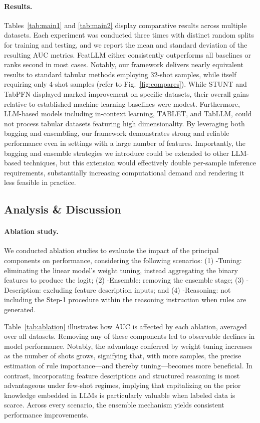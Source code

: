 \vspace*{-0.12in}
\paragraph{Results.}
Tables~\ref{tab:main1} and \ref{tab:main2} display comparative results across multiple datasets. Each experiment was conducted three times with distinct random splits for training and testing, and we report the mean and standard deviation of the resulting AUC metrics. \textsf{FeatLLM} either consistently outperforms all baselines or ranks second in most cases. Notably, our framework delivers nearly equivalent results to standard tabular methods employing 32-shot samples, while itself requiring only 4-shot samples (refer to Fig.~\ref{fig:compares}). While STUNT and TabPFN displayed marked improvement on specific datasets, their overall gains relative to established machine learning baselines were modest. Furthermore, LLM-based models including in-context learning, TABLET, and TabLLM, could not process tabular datasets featuring high dimensionality. By leveraging both bagging and ensembling, our framework demonstrates strong and reliable performance even in settings with a large number of features. Importantly, the bagging and ensemble strategies we introduce could be extended to other LLM-based techniques, but this extension would effectively double per-sample inference requirements, substantially increasing computational demand and rendering it less feasible in practice.

\subsection{Analysis \& Discussion}
\label{sec:analysis}
\paragraph{Ablation study.} We conducted ablation studies to evaluate the impact of the principal components on performance, considering the following scenarios: (1) \textsf{-Tuning}: eliminating the linear model's weight tuning, instead aggregating the binary features to produce the logit; (2) \textsf{-Ensemble}: removing the ensemble stage; (3) \textsf{-Description}: excluding feature description inputs; and (4) \textsf{-Reasoning}: not including the Step-1 procedure within the reasoning instruction when rules are generated.

Table~\ref{tab:ablation} illustrates how AUC is affected by each ablation, averaged over all datasets. Removing any of these components led to observable declines in model performance. Notably, the advantage conferred by weight tuning increases as the number of shots grows, signifying that, with more samples, the precise estimation of rule importance—and thereby tuning—becomes more beneficial. In contrast, incorporating feature descriptions and structured reasoning is most advantageous under few-shot regimes, implying that capitalizing on the prior knowledge embedded in LLMs is particularly valuable when labeled data is scarce. Across every scenario, the ensemble mechanism yields consistent performance improvements.

